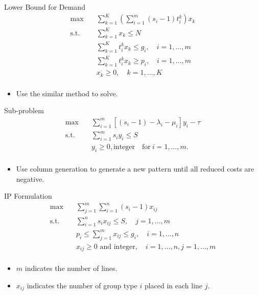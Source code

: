     \begin{frame}{Lower Bound for Demand}
      \[\begin{split}\mbox{max}\quad & \sum_{k=1}^K(\sum_{i=1}^m (s_i-1)t_i^k) x_{k}\\
      \mbox{s.t.} \quad & \sum_{k=1}^K x_{k} \leq N \\
      & \sum_{k=1}^K t_i^k x_k \leq g_i,\quad i=1,\ldots,m\\
      & \sum_{k=1}^K t_i^k x_k \geq p_i,\quad i=1,\ldots,m\\
      & x_{k} \geq 0, \quad k = 1,\ldots,K \\
      \end{split}\]
      \begin{itemize}
        \item Use the similar method to solve.
      \end{itemize}
    \end{frame}

    \begin{frame}{Sub-problem}
      \[\begin{split}\mbox{max}\quad & \sum_{i=1}^m \left[(s_i-1) -\lambda_i - \mu_i \right] y_{i} - \tau \\
      \mbox{s.t.} \quad & \sum_{i=1}^m s_i y_i \leq S  \\
      & y_i \geq 0, \mbox{integer}\quad \mbox{for}~ i=1,\ldots,m.\\\end{split}\]
      \begin{itemize}
        \item Use column generation to generate a new pattern until all reduced costs are negative.
      \end{itemize}
    \end{frame}

    \begin{frame}{IP Formulation}
      \[\begin{split}\mbox{max}\quad & \sum_{j=1}^{m} \sum_{i=1}^n (s_i-1) x_{ij} \\
      \mbox{s.t.} \quad & \sum_{i=1}^n s_i x_{ij} \leq S, \quad j=1,\ldots,m \\
      & p_i \leq \sum_{j=1}^{m} x_{ij} \leq g_i ,\quad i=1,\ldots,n \\
      & x_{ij} \geq 0 \mbox{ and integer}, \quad i=1,\ldots,n, j=1,\ldots,m \\\end{split}\]
      \begin{itemize}
        \item $m$ indicates the number of lines.
        \item $x_{ij}$ indicates the number of group type $i$ placed in each line $j$.
      \end{itemize}
    \end{frame}

